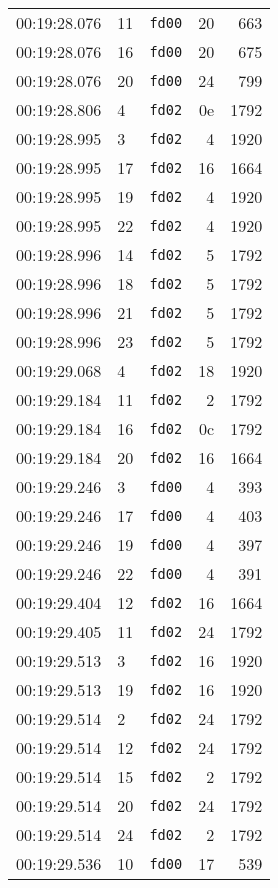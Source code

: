 \documentclass{article}
\begin{document}
\begin{longtable}{lllrr}
00:19:28.076 & 11 & \texttt{fd00} & 20 & 663 \\
00:19:28.076 & 16 & \texttt{fd00} & 20 & 675 \\
00:19:28.076 & 20 & \texttt{fd00} & 24 & 799 \\
00:19:28.806 & 4 & \texttt{fd02} & 0e & 1792 \\
00:19:28.995 & 3 & \texttt{fd02} & 4 & 1920 \\
00:19:28.995 & 17 & \texttt{fd02} & 16 & 1664 \\
00:19:28.995 & 19 & \texttt{fd02} & 4 & 1920 \\
00:19:28.995 & 22 & \texttt{fd02} & 4 & 1920 \\
00:19:28.996 & 14 & \texttt{fd02} & 5 & 1792 \\
00:19:28.996 & 18 & \texttt{fd02} & 5 & 1792 \\
00:19:28.996 & 21 & \texttt{fd02} & 5 & 1792 \\
00:19:28.996 & 23 & \texttt{fd02} & 5 & 1792 \\
00:19:29.068 & 4 & \texttt{fd02} & 18 & 1920 \\
00:19:29.184 & 11 & \texttt{fd02} & 2 & 1792 \\
00:19:29.184 & 16 & \texttt{fd02} & 0c & 1792 \\
00:19:29.184 & 20 & \texttt{fd02} & 16 & 1664 \\
00:19:29.246 & 3 & \texttt{fd00} & 4 & 393 \\
00:19:29.246 & 17 & \texttt{fd00} & 4 & 403 \\
00:19:29.246 & 19 & \texttt{fd00} & 4 & 397 \\
00:19:29.246 & 22 & \texttt{fd00} & 4 & 391 \\
00:19:29.404 & 12 & \texttt{fd02} & 16 & 1664 \\
00:19:29.405 & 11 & \texttt{fd02} & 24 & 1792 \\
00:19:29.513 & 3 & \texttt{fd02} & 16 & 1920 \\
00:19:29.513 & 19 & \texttt{fd02} & 16 & 1920 \\
00:19:29.514 & 2 & \texttt{fd02} & 24 & 1792 \\
00:19:29.514 & 12 & \texttt{fd02} & 24 & 1792 \\
00:19:29.514 & 15 & \texttt{fd02} & 2 & 1792 \\
00:19:29.514 & 20 & \texttt{fd02} & 24 & 1792 \\
00:19:29.514 & 24 & \texttt{fd02} & 2 & 1792 \\
00:19:29.536 & 10 & \texttt{fd00} & 17 & 539 \\

\end{longtable}
\end{document}
